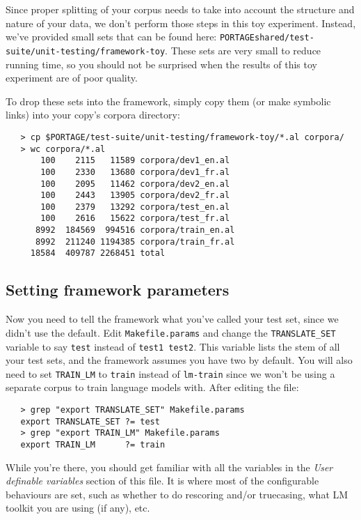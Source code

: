 \documentclass[11pt]{article}
\begin{document}
Since proper splitting of your corpus needs to take into account the structure
and nature of your data, we don't perform those steps in this toy experiment.
Instead, we've provided small sets that can be found here:
\texttt{PORTAGEshared/test-suite/unit-testing/framework-toy}.  These sets
are very small to reduce running time, so you should not be surprised when the
results of this toy experiment are of poor quality.

To drop these sets into the framework, simply copy them (or make symbolic
links) into your copy's corpora directory:
\begin{verbatim}
   > cp $PORTAGE/test-suite/unit-testing/framework-toy/*.al corpora/
   > wc corpora/*.al
       100    2115   11589 corpora/dev1_en.al
       100    2330   13680 corpora/dev1_fr.al
       100    2095   11462 corpora/dev2_en.al
       100    2443   13905 corpora/dev2_fr.al
       100    2379   13292 corpora/test_en.al
       100    2616   15622 corpora/test_fr.al
      8992  184569  994516 corpora/train_en.al
      8992  211240 1194385 corpora/train_fr.al
     18584  409787 2268451 total
\end{verbatim}

\subsection{Setting framework parameters} \label{FrameworkParams}

Now you need to tell the framework what you've called your test set, since we
didn't use the default.  Edit \texttt{Makefile.params} and change the
\texttt{TRANSLATE\_SET} variable to say
\texttt{test} instead of \texttt{test1 test2}.
This variable lists the stem of all your test sets, and the framework
assumes you have two by default.
You will also need to set \texttt{TRAIN\_LM} to \texttt{train} instead of
\texttt{lm-train} since we won't be using a separate corpus to train language
models with.
After editing the file:
\begin{verbatim}
   > grep "export TRANSLATE_SET" Makefile.params
   export TRANSLATE_SET ?= test
   > grep "export TRAIN_LM" Makefile.params
   export TRAIN_LM      ?= train
\end{verbatim}

While you're there, you should get familiar with all the variables in the
\emph{User definable variables} section of this file.  It is where most of the
configurable behaviours are set, such as whether to do rescoring and/or
truecasing, what LM toolkit you are using (if any), etc.  
\end{document}
